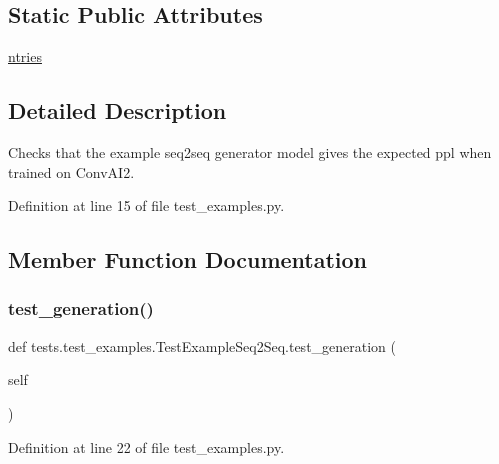 \subsection*{Static Public Attributes}
\begin{DoxyCompactItemize}
\item 
\hyperlink{classtests_1_1test__examples_1_1TestExampleSeq2Seq_a4fab0cbc7ef41b880a229fcd895dd279}{ntries}
\end{DoxyCompactItemize}


\subsection{Detailed Description}
\begin{DoxyVerb}Checks that the example seq2seq generator model gives the expected ppl when trained
on ConvAI2.
\end{DoxyVerb}
 

Definition at line 15 of file test\+\_\+examples.\+py.



\subsection{Member Function Documentation}
\mbox{\label{classtests_1_1test__examples_1_1TestExampleSeq2Seq_a288b619db2ba3d957b8afff63143baba}} 
\subsubsection{\texorpdfstring{test\+\_\+generation()}{test\_generation()}}
{\footnotesize\ttfamily def tests.\+test\+\_\+examples.\+Test\+Example\+Seq2\+Seq.\+test\+\_\+generation (\begin{DoxyParamCaption}\item[{}]{self }\end{DoxyParamCaption})}



Definition at line 22 of file test\+\_\+examples.\+py.


